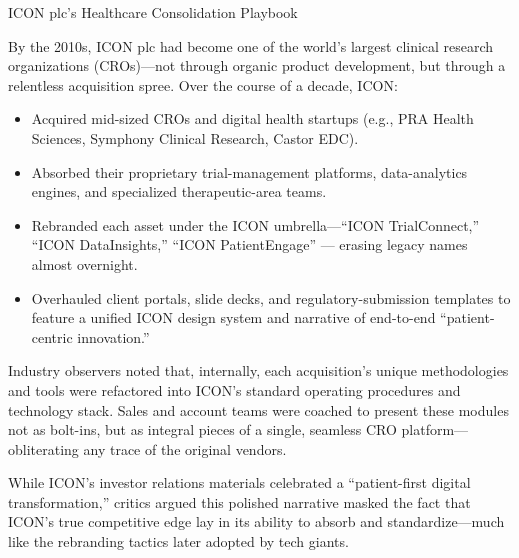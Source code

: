 \begin{HistoricalSidebar}{ICON plc’s Healthcare Consolidation Playbook}

  By the 2010s, ICON plc had become one of the world’s largest clinical research organizations (CROs)—not through organic product development, but through a relentless acquisition spree.  Over the course of a decade, ICON:
 
  \medskip

  \begin{itemize}

    \item Acquired mid-sized CROs and digital health startups (e.g., PRA Health Sciences, Symphony Clinical Research, 
    Castor EDC).

    \medskip

    \item Absorbed their proprietary trial-management platforms, data-analytics engines, and specialized 
    therapeutic-area teams.

    \medskip

    \item Rebranded each asset under the ICON umbrella—“ICON TrialConnect,” “ICON DataInsights,” “ICON PatientEngage” 
    --- erasing legacy names almost overnight.

    \medskip

    \item Overhauled client portals, slide decks, and regulatory-submission templates to feature a unified ICON design 
    system and narrative of end-to-end “patient-centric innovation.”

  \end{itemize}

  \medskip
  
  Industry observers noted that, internally, each acquisition’s unique methodologies and tools were refactored into 
  ICON’s standard operating procedures and technology stack.  Sales and account teams were coached to present these 
  modules not as bolt-ins, but as integral pieces of a single, seamless CRO platform—obliterating any trace of the 
  original vendors.  

  \medskip
  
  While ICON’s investor relations materials celebrated a “patient-first digital transformation,” critics argued this polished narrative masked the fact that ICON’s true competitive edge lay in its ability to absorb and standardize—much like the rebranding tactics later adopted by tech giants.  

\end{HistoricalSidebar}


